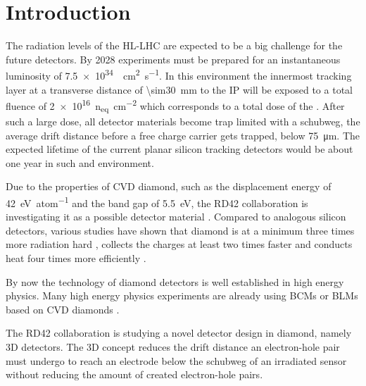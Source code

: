 \section{Introduction}
The radiation levels of the \ac{HL-LHC} are expected to be a big challenge for the future detectors. By 2028 experiments must be prepared for an instantaneous luminosity of \SI{7.5e34}{\per\centi\meter\squared\per\second}. In this environment the innermost tracking layer at a transverse distance of \SI{\sim30}{\milli\meter} to the \acl{IP} will be exposed to a total fluence of \SI{2e16}{n_{eq}\per\centi\meter^2} which corresponds to a total dose of the  \cite{dose}. After such a large dose, all detector materials become trap limited with a schubweg, the average drift distance before a free charge carrier gets trapped, below \SI{75}{\micro\meter}.  The expected lifetime of the current planar silicon tracking detectors would be about one year in such and environment.\par
Due to the properties of \ac{CVD} diamond, such as the displacement energy of \SI{42}{\electronvolt\per atom} and the band gap of \SI{5.5}{\electronvolt}, the RD42 collaboration is investigating it as a possible detector material \cite{rd42}. Compared to analogous silicon detectors,  various studies have shown that diamond is at a minimum three times more radiation hard \cite{deboer}, collects the charges at least two times faster \cite{pernegger} and conducts heat four times more efficiently \cite{zhao}.\par
By now the technology of diamond detectors is well established in high energy physics. Many high energy physics experiments are already using \aclp{BCM} or \aclp{BLM} based on \ac{CVD} diamonds \cite{babar, bcm, dbm1}.\par
The RD42 collaboration is studying a novel detector design in diamond, namely 3D detectors. The 3D concept reduces the drift distance an electron-hole pair must undergo to reach an electrode below the schubweg of an irradiated sensor without reducing the amount of created electron-hole pairs.
